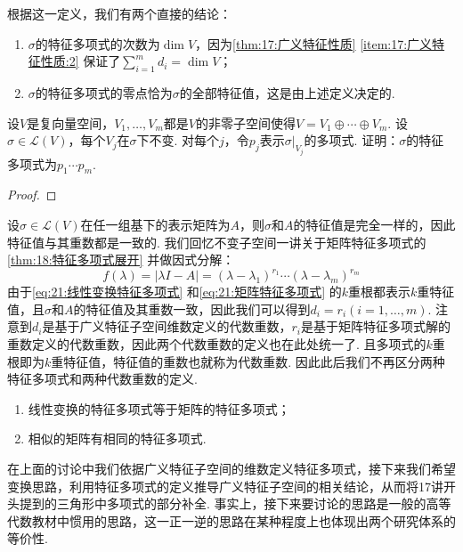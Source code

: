 根据这一定义，我们有两个直接的结论：
\begin{enumerate}
    \item $\sigma$的特征多项式的次数为$\dim V$，因为\autoref{thm:17:广义特征性质} \ref*{item:17:广义特征性质:2} 保证了$\displaystyle\sum_{i=1}^m d_i=\dim V$；

    \item $\sigma$的特征多项式的零点恰为$\sigma$的全部特征值，这是由上述定义决定的.
\end{enumerate}

\begin{example}
    设$V$是复向量空间，$V_1,\ldots,V_m$都是$V$的非零子空间使得$V=V_1\oplus\cdots\oplus V_m$. 设$\sigma\in \mathcal{L}(V)$，每个$V_j$在$\sigma$下不变. 对每个$j$，令$p_j$表示$\sigma|_{V_j}$的多项式. 证明：$\sigma$的特征多项式为$p_1\cdots p_m$.
\end{example}

\begin{proof}

\end{proof}

设$\sigma\in\mathcal{L}(V)$在任一组基下的表示矩阵为$A$，则$\sigma$和$A$的特征值是完全一样的，因此特征值与其重数都是一致的. 我们回忆不变子空间一讲关于矩阵特征多项式的\autoref{thm:18:特征多项式展开} 并做因式分解：
\begin{equation}\label{eq:21:矩阵特征多项式}
    f(\lambda)=|\lambda I-A|=(\lambda-\lambda_1)^{r_1}\cdots(\lambda-\lambda_m)^{r_m}
\end{equation}
由于\autoref{eq:21:线性变换特征多项式} 和\autoref{eq:21:矩阵特征多项式} 的$k$重根都表示$k$重特征值，且$\sigma$和$A$的特征值及其重数一致，因此我们可以得到$d_i=r_i(i=1,\ldots,m)$. 注意到$d_i$是基于广义特征子空间维数定义的代数重数，$r_i$是基于矩阵特征多项式解的重数定义的代数重数，因此两个代数重数的定义也在此处统一了. 且多项式的$k$重根即为$k$重特征值，特征值的重数也就称为代数重数. 因此此后我们不再区分两种特征多项式和两种代数重数的定义.

\begin{corollary}
    \begin{enumerate}
        \item 线性变换的特征多项式等于矩阵的特征多项式；
        \item 相似的矩阵有相同的特征多项式.
    \end{enumerate}
\end{corollary}

在上面的讨论中我们依据广义特征子空间的维数定义特征多项式，接下来我们希望变换思路，利用特征多项式的定义推导广义特征子空间的相关结论，从而将17讲开头提到的三角形中多项式的部分补全. 事实上，接下来要讨论的思路是一般的高等代数教材中惯用的思路，这一正一逆的思路在某种程度上也体现出两个研究体系的等价性.

